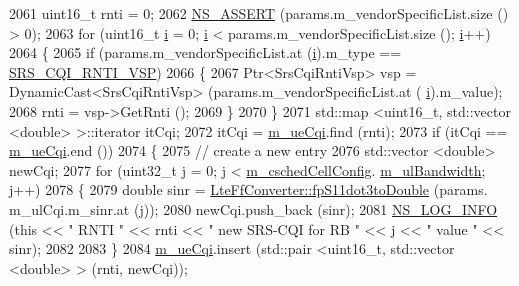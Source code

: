 \begin{DoxyCode}
2061         uint16\_t rnti = 0;
2062         \hyperlink{assert_8h_a6dccdb0de9b252f60088ce281c49d052}{NS\_ASSERT} (params.m\_vendorSpecificList.size () > 0);
2063         \textcolor{keywordflow}{for} (uint16\_t \hyperlink{bernuolliDistribution_8m_a6f6ccfcf58b31cb6412107d9d5281426}{i} = 0; \hyperlink{bernuolliDistribution_8m_a6f6ccfcf58b31cb6412107d9d5281426}{i} < params.m\_vendorSpecificList.size (); \hyperlink{bernuolliDistribution_8m_a6f6ccfcf58b31cb6412107d9d5281426}{i}++)
2064           \{
2065             \textcolor{keywordflow}{if} (params.m\_vendorSpecificList.at (\hyperlink{bernuolliDistribution_8m_a6f6ccfcf58b31cb6412107d9d5281426}{i}).m\_type == \hyperlink{lte-vendor-specific-parameters_8h_a3b5e6e766032ab4a8e374a1cfd237a26}{SRS\_CQI\_RNTI\_VSP})
2066               \{
2067                 Ptr<SrsCqiRntiVsp> vsp = DynamicCast<SrsCqiRntiVsp> (params.m\_vendorSpecificList.at (
      \hyperlink{bernuolliDistribution_8m_a6f6ccfcf58b31cb6412107d9d5281426}{i}).m\_value);
2068                 rnti = vsp->GetRnti ();
2069               \}
2070           \}
2071         std::map <uint16\_t, std::vector <double> >::iterator itCqi;
2072         itCqi = \hyperlink{classns3_1_1PfFfMacScheduler_acf67c0074356c705e8bd89bb49ddd5ad}{m\_ueCqi}.find (rnti);
2073         \textcolor{keywordflow}{if} (itCqi == \hyperlink{classns3_1_1PfFfMacScheduler_acf67c0074356c705e8bd89bb49ddd5ad}{m\_ueCqi}.end ())
2074           \{
2075             \textcolor{comment}{// create a new entry}
2076             std::vector <double> newCqi;
2077             \textcolor{keywordflow}{for} (uint32\_t j = 0; j < \hyperlink{classns3_1_1PfFfMacScheduler_a0be1f7a1e78824b031e48208b8af1048}{m\_cschedCellConfig}.
      \hyperlink{structns3_1_1FfMacCschedSapProvider_1_1CschedCellConfigReqParameters_a5ab5b102878e6e7e7727a14af4a64d2f}{m\_ulBandwidth}; j++)
2078               \{
2079                 \textcolor{keywordtype}{double} sinr = \hyperlink{classns3_1_1LteFfConverter_aa5d8c2a8f988dbd63da91818c18666eb}{LteFfConverter::fpS11dot3toDouble} (params.
      m\_ulCqi.m\_sinr.at (j));
2080                 newCqi.push\_back (sinr);
2081                 \hyperlink{group__logging_gafbd73ee2cf9f26b319f49086d8e860fb}{NS\_LOG\_INFO} (\textcolor{keyword}{this} << \textcolor{stringliteral}{" RNTI "} << rnti << \textcolor{stringliteral}{" new SRS-CQI for RB  "} << j << \textcolor{stringliteral}{" value
       "} << sinr);
2082 
2083               \}
2084             \hyperlink{classns3_1_1PfFfMacScheduler_acf67c0074356c705e8bd89bb49ddd5ad}{m\_ueCqi}.insert (std::pair <uint16\_t, std::vector <double> > (rnti, newCqi));

\end{DoxyCode}
